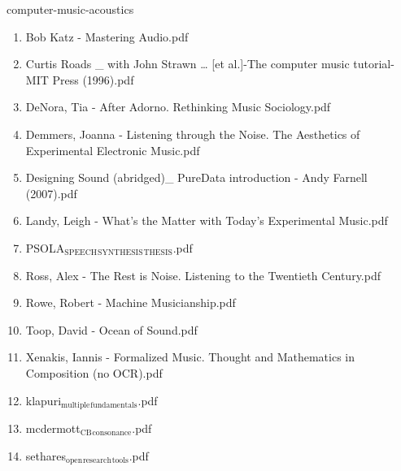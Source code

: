 \documentclass[11pt]{article}
\begin{document}
\item computer-music-acoustics
\label{sec-1-1-1-1-11-19}
\begin{enumerate}
\item Bob Katz - Mastering Audio.pdf
\label{sec-1-1-1-1-11-19-1}

\item Curtis Roads \_ with John Strawn \ldots{} [et al.]-The computer music tutorial-MIT Press (1996).pdf
\label{sec-1-1-1-1-11-19-2}

\item DeNora, Tia - After Adorno. Rethinking Music Sociology.pdf
\label{sec-1-1-1-1-11-19-3}

\item Demmers, Joanna - Listening through the Noise. The Aesthetics of Experimental Electronic Music.pdf
\label{sec-1-1-1-1-11-19-4}

\item Designing Sound (abridged)\_ PureData introduction - Andy Farnell (2007).pdf
\label{sec-1-1-1-1-11-19-5}

\item Landy, Leigh - What's the Matter with Today's Experimental Music.pdf
\label{sec-1-1-1-1-11-19-6}

\item PSOLA$_{\text{SPEECH}}$$_{\text{SYNTHESIS}}$$_{\text{THESIS}}$.pdf
\label{sec-1-1-1-1-11-19-7}

\item Ross, Alex - The Rest is Noise. Listening to the Twentieth Century.pdf
\label{sec-1-1-1-1-11-19-8}

\item Rowe, Robert - Machine Musicianship.pdf
\label{sec-1-1-1-1-11-19-9}

\item Toop, David - Ocean of Sound.pdf
\label{sec-1-1-1-1-11-19-10}

\item Xenakis, Iannis - Formalized Music. Thought and Mathematics in Composition (no OCR).pdf
\label{sec-1-1-1-1-11-19-11}

\item klapuri$_{\text{multiple}}$$_{\text{fundamentals}}$.pdf
\label{sec-1-1-1-1-11-19-12}

\item mcdermott$_{\text{CB}}$$_{\text{consonance}}$.pdf
\label{sec-1-1-1-1-11-19-13}

\item sethares$_{\text{open}}$$_{\text{research}}$$_{\text{tools}}$.pdf
\label{sec-1-1-1-1-11-19-14}


\end{enumerate}
\end{document}
